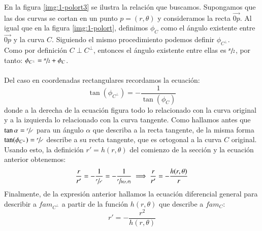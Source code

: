 En la figura \ref{img:1-polort3} se ilustra la relación que buscamos. Supongamos que las dos curvas se cortan en un punto $p = (r, \theta)$ y consideramos la recta $\vec{0p}$. Al igual que en la figura \ref{img:1-polort}, definimos $\phi_C$ como el ángulo existente entre $\vec{0p}$ y la curva $C$. Siguiendo el mismo procedimiento podemos definir $\phi_{C^\perp}$.\\
Como por definición $C \perp C^{\perp}$, entonces el ángulo existente entre ellas es $\sfrac{\pi}{2}$, por tanto: $\phi_{C^\perp} = \sfrac{\pi}{2} + \phi_C$.\\\\
Del caso en coordenadas rectangulares recordamos la ecuación:
$$
\tan(\phi_{C^\perp}) = -\frac{1}{ \tan(\phi_C)}
$$
donde a la derecha de la ecuación figura todo lo relacionado con la curva original y a la izquierda lo relacionado con la curva tangente. Como hallamos antes que $\tan\alpha = \sfrac{r}{r'}$ para un ángulo $\alpha$ que describa a la recta tangente, de la misma forma $\tan(\phi_{C^\perp}) = \sfrac{r}{r'}$ describe a su recta tangente, que es ortogonal a la curva $C$ original.\\ Usando esto, la definición $r' = h(r, \theta)$ del comienzo de la sección y la ecuación anterior obtenemos:
$$
\frac{r}{r'} = -\frac{1}{\sfrac{r}{r'}} = -\frac{1}{\sfrac{r}{h(r,\theta)}} \implies \frac{r}{r'} = -\frac{h(r,\theta)}{r}
$$
Finalmente, de la expresión anterior hallamos la ecuación diferencial general para describir a $fam_{C^\perp}$ a partir de la función $h(r, \theta)$ que describe a $fam_C$:
$$
    r' = -\frac{r^2}{h(r, \theta)}
$$
